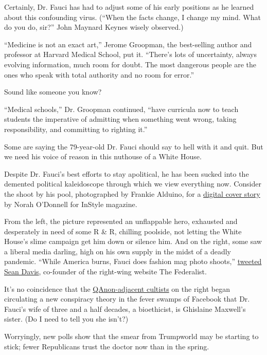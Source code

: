Certainly, Dr. Fauci has had to adjust some of his early positions as he
learned about this confounding virus. (``When the facts change, I change
my mind. What do you do, sir?'' John Maynard Keynes wisely observed.)

``Medicine is not an exact art,'' Jerome Groopman, the best-selling
author and professor at Harvard Medical School, put it. ``There's lots
of uncertainty, always evolving information, much room for doubt. The
most dangerous people are the ones who speak with total authority and no
room for error.''

Sound like someone you know?

``Medical schools,'' Dr. Groopman continued, ``have curricula now to
teach students the imperative of admitting when something went wrong,
taking responsibility, and committing to righting it.''

Some are saying the 79-year-old Dr. Fauci should say to hell with it and
quit. But we need his voice of reason in this nuthouse of a White House.

Despite Dr. Fauci's best efforts to stay apolitical, he has been sucked
into the demented political kaleidoscope through which we view
everything now. Consider the shoot by his pool, photographed by Frankie
Alduino, for a
\href{https://www.instyle.com/news/dr-fauci-says-with-all-due-modesty-i-think-im-pretty-effective}{digital
cover story} by Norah O'Donnell for InStyle magazine.

From the left, the picture represented an unflappable hero, exhausted
and desperately in need of some R \& R, chilling poolside, not letting
the White House's slime campaign get him down or silence him. And on the
right, some saw a liberal media darling, high on his own supply in the
midst of a deadly pandemic. ``While America burns, Fauci does fashion
mag photo shoots,''
\href{https://twitter.com/seanmdav/status/1283602972426067971}{tweeted
Sean Davis}, co-founder of the right-wing website The Federalist.

It's no coincidence that the
\href{https://www.nytimes.com/2020/07/14/us/politics/qanon-politicians-candidates.html}{QAnon-adjacent
cultists} on the right began circulating a new conspiracy theory in the
fever swamps of Facebook that Dr. Fauci's wife of three and a half
decades, a bioethicist, is Ghislaine Maxwell's sister. (Do I need to
tell you she isn't?)

Worryingly, new polls show that the smear from Trumpworld may be
starting to stick; fewer Republicans trust the doctor now than in the
spring.

